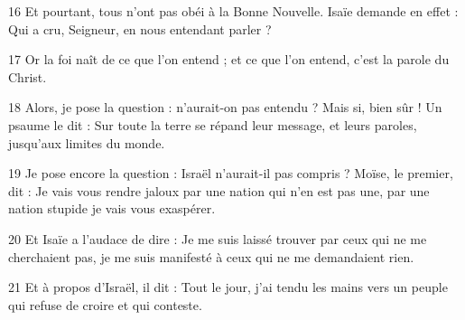 
16 Et pourtant, tous n’ont pas obéi à la Bonne Nouvelle. Isaïe demande en effet : Qui a cru, Seigneur, en nous entendant parler ?

17 Or la foi naît de ce que l’on entend ; et ce que l’on entend, c’est la parole du Christ.

18 Alors, je pose la question : n’aurait-on pas entendu ? Mais si, bien sûr ! Un psaume le dit : Sur toute la terre se répand leur message, et leurs paroles, jusqu’aux limites du monde.

19 Je pose encore la question : Israël n’aurait-il pas compris ? Moïse, le premier, dit : Je vais vous rendre jaloux par une nation qui n’en est pas une, par une nation stupide je vais vous exaspérer.

20 Et Isaïe a l’audace de dire : Je me suis laissé trouver par ceux qui ne me cherchaient pas, je me suis manifesté à ceux qui ne me demandaient rien.

21 Et à propos d’Israël, il dit : Tout le jour, j’ai tendu les mains vers un peuple qui refuse de croire et qui conteste.